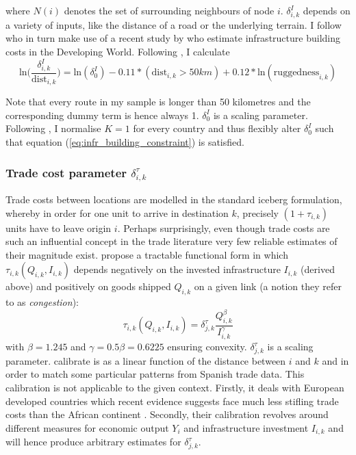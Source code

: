 \documentclass[11pt, oneside]{article}   	%
\begin{document}
where $N(i)$ denotes the set of surrounding neighbours of node $i$. $\delta_{i,k}^{I}$ depends on a variety of inputs, like the distance of a road or the underlying terrain. I follow \citeauthor{fajgelbaum_optimal_2017} who in turn make use of a recent study by \cite{collier_cost_2015} who estimate infrastructure building costs in the Developing World. Following \citeauthor{fajgelbaum_optimal_2017}, I calculate
\begin{equation}
  \textrm{ln}\Big(\frac{\delta^{I}_{i,k}}{\textrm{dist}_{i,k}}\Big) = \textrm{ln}(\delta_{0}^{I}) - 0.11*(\textrm{dist}_{i,k} > 50km) + 0.12*\textrm{ln}(\textrm{ruggedness}_{i,k})
\end{equation}

Note that every route in my sample is longer than 50 kilometres and the corresponding dummy term is hence always 1. $\delta_{0}^{I}$ is a scaling parameter. Following \citeauthor{fajgelbaum_optimal_2017}, I normalise $K=1$ for every country and thus flexibly alter $\delta_{0}^{I}$ such that equation (\ref{eq:infr_building_constraint}) is satisfied.

\subsubsection{Trade cost parameter $\delta_{i,k}^{\tau}$}
Trade costs between locations are modelled in the standard iceberg formulation, whereby in order for one unit to arrive in destination $k$, precisely $(1+\tau_{i,k})$ units have to leave origin $i$. Perhaps surprisingly, even though trade costs are such an influential concept in the trade literature very few reliable estimates of their magnitude exist. \citeauthor{fajgelbaum_optimal_2017} propose a tractable functional form in which $\tau_{i,k}(Q_{i,k}, I_{i,k})$ depends negatively on the invested infrastructure $I_{i,k}$ (derived above) and positively on goods shipped $Q_{i,k}$ on a given link (a notion they refer to as \emph{congestion}):
\begin{equation}
  \tau_{i,k}(Q_{i,k}, I_{i,k}) = \delta^{\tau}_{j, k} \frac{Q_{i,k}^{\beta}}{I_{i,k}^{\gamma}}
\end{equation}
with $\beta = 1.245$ and $\gamma = 0.5\beta = 0.6225$ ensuring convexity. $\delta^{\tau}_{j, k}$ is a scaling parameter. \citeauthor{fajgelbaum_optimal_2017} calibrate is as a linear function of the distance between $i$ and $k$ and in order to match some particular patterns from Spanish trade data. This calibration is not applicable to the given context. Firstly, it deals with European developed countries which recent evidence suggests face much less stifling trade costs than the African continent \citep[see e.g.][]{Anderson_Tradecosts_2004}. Secondly, their calibration revolves around different measures for economic output $Y_{i}$ and infrastructure investment $I_{i,k}$ and will hence produce arbitrary estimates for $\delta^{\tau}_{j, k}$.
\end{document}
